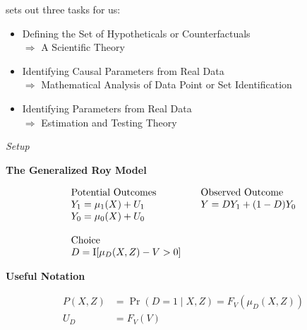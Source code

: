 \begin{frame}
\citet{Heckman.2008a} sets out three tasks for us:

\begin{itemize}
\item Defining the Set of Hypotheticals or Counterfactuals \\\hspace{0.3cm}
    $\Rightarrow$ A Scientific Theory
\item Identifying Causal Parameters from Real Data \\\hspace{0.3cm}
    $\Rightarrow$ Mathematical Analysis of  Data Point or Set Identification
\item Identifying Parameters from Real Data\\\hspace{0.3cm}
    $\Rightarrow$ Estimation and Testing Theory
\end{itemize}

\end{frame}
\begin{frame}\begin{center}
\LARGE\textit{Setup}
\end{center}\end{frame}
\begin{frame}
\textbf{The Generalized Roy Model}

\begin{align*}\begin{array}{l@{\qquad}l}
\text{Potential Outcomes} &\text{Observed Outcome}\\
Y_1 = \mu_1(X) + U_1      &  Y = D Y_1 + (1 - D)Y_0 \\
Y_0 = \mu_0(X) + U_0      &\\
    & \\
\text{Choice} & \\
D = \mathrm{I}[\mu_D(X, Z) - V > 0] & \\
\end{array}
\end{align*}
\end{frame}

\begin{frame}
\textbf{Useful Notation}

\begin{align*}
P(X, Z) & = \Pr(D = 1\mid X, Z) = F_V(\mu_D(X, Z)) \\
U_D     & = F_V(V)
\end{align*}

\end{frame}

